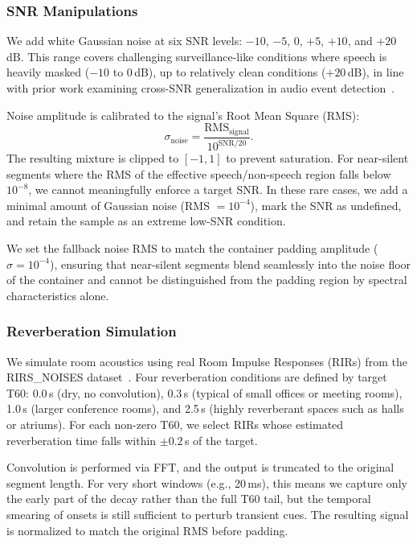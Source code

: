 \documentclass[11pt,a4paper]{article}
\begin{document}
\subsubsection{SNR Manipulations}
\label{subsubsec:snr}

We add white Gaussian noise at six SNR levels: $-10$, $-5$, 0, $+5$, $+10$, and $+20$\,dB. This range covers challenging surveillance-like conditions where speech is heavily masked ($-10$ to 0\,dB), up to relatively clean conditions ($+20$\,dB), in line with prior work examining cross-SNR generalization in audio event detection~\cite{turpault2021sound}.

Noise amplitude is calibrated to the signal's Root Mean Square (RMS):
\begin{equation}
\sigma_{\text{noise}} = \frac{\text{RMS}_{\text{signal}}}{10^{\text{SNR}/20}}.
\end{equation}
The resulting mixture is clipped to $[-1, 1]$ to prevent saturation. For near-silent segments where the RMS of the effective speech/non-speech region falls below $10^{-8}$, we cannot meaningfully enforce a target SNR. In these rare cases, we add a minimal amount of Gaussian noise (RMS $= 10^{-4}$), mark the SNR as undefined, and retain the sample as an extreme low-SNR condition.

We set the fallback noise RMS to match the container padding amplitude ($\sigma = 10^{-4}$),
ensuring that near-silent segments blend seamlessly into the noise floor of the container
and cannot be distinguished from the padding region by spectral characteristics alone.

\subsubsection{Reverberation Simulation}
\label{subsubsec:reverb}

We simulate room acoustics using real Room Impulse Responses (RIRs) from the RIRS\_NOISES dataset~\cite{ko2017study}. Four reverberation conditions are defined by target T60: 0.0\,s (dry, no convolution), 0.3\,s (typical of small offices or meeting rooms), 1.0\,s (larger conference rooms), and 2.5\,s (highly reverberant spaces such as halls or atriums). For each non-zero T60, we select RIRs whose estimated reverberation time falls within $\pm 0.2$\,s of the target.

Convolution is performed via FFT, and the output is truncated to the original segment length. For very short windows (e.g., 20\,ms), this means we capture only the early part of the decay rather than the full T60 tail, but the temporal smearing of onsets is still sufficient to perturb transient cues. The resulting signal is normalized to match the original RMS before padding.
\end{document}
